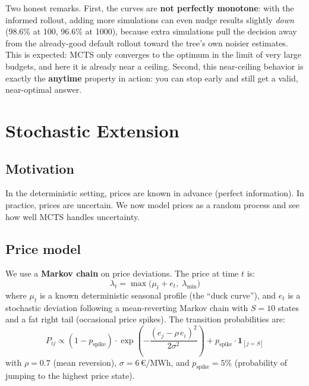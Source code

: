 \documentclass[12pt,a4paper]{article}
\begin{document}
Two honest remarks. First, the curves are \textbf{not perfectly monotone}:
with the informed rollout, adding more simulations can even nudge results
slightly \emph{down} (98.6\% at 100, 96.6\% at 1000), because extra
simulations pull the decision away from the already-good default rollout
toward the tree's own noisier estimates. This is expected: MCTS only converges
to the optimum in the limit of very large budgets, and here it is already near
a ceiling. Second, this near-ceiling behavior is exactly the \textbf{anytime}
property in action: you can stop early and still get a valid, near-optimal
answer.

\section{Stochastic Extension}

\subsection{Motivation}

In the deterministic setting, prices are known in advance (perfect
information). In practice, prices are uncertain. We now model prices as a
random process and see how well MCTS handles uncertainty.

\subsection{Price model}

We use a \textbf{Markov chain} on price deviations. The price at time $t$ is:
\begin{equation}
  \lambda_t = \max\!\bigl(\mu_t + e_t,\; \lambda_{\min}\bigr)
\end{equation}
where $\mu_t$ is a known deterministic seasonal profile (the ``duck curve''),
and $e_t$ is a stochastic deviation following a mean-reverting Markov chain
with $S = 10$ states and a fat right tail (occasional price spikes). The
transition probabilities are:
\begin{equation}
  P_{ij} \propto (1 - p_{\mathrm{spike}}) \cdot
    \exp\!\left(-\frac{(e_j - \rho\, e_i)^2}{2\sigma^2}\right)
    + p_{\mathrm{spike}} \cdot \mathbf{1}_{[j = S]}
\end{equation}
with $\rho = 0.7$ (mean reversion), $\sigma = 6$\,\euro/MWh, and
$p_{\mathrm{spike}} = 5\%$ (probability of jumping to the highest price state).
\end{document}

